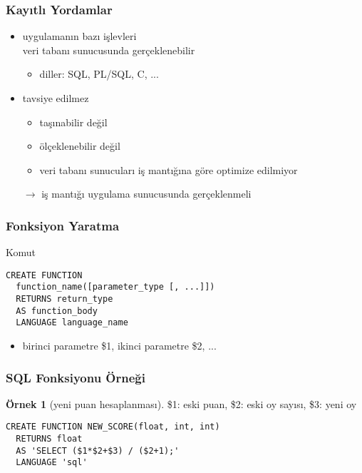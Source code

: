 \documentclass[dvipsnames]{beamer}
\theoremstyle{definition}
\theoremstyle{example}
\newtheorem{ornek}[theorem]{Örnek}
\theoremstyle{plain}
\begin{document}
\begin{frame}
  \frametitle{Kayıtlı Yordamlar}

  \begin{itemize}
    \item uygulamanın bazı işlevleri\\
      veri tabanı sunucusunda gerçeklenebilir
    \begin{itemize}
      \item diller: SQL, PL/SQL, C, ...
    \end{itemize}

    \pause
    \bigskip
    \item \alert{tavsiye edilmez}
    \begin{itemize}
      \item taşınabilir değil
      \item ölçeklenebilir değil
      \item veri tabanı sunucuları iş mantığına göre optimize edilmiyor
    \end{itemize}
    $\rightarrow$ iş mantığı uygulama sunucusunda gerçeklenmeli
  \end{itemize}
\end{frame}

\begin{frame}[fragile]
  \frametitle{Fonksiyon Yaratma}

  \begin{block}{Komut}
    \begin{lstlisting}
CREATE FUNCTION
  function_name([parameter_type [, ...]])
  RETURNS return_type
  AS function_body
  LANGUAGE language_name
    \end{lstlisting}
  \end{block}

  \begin{itemize}
    \item birinci parametre \$1, ikinci parametre \$2, ...
  \end{itemize}
\end{frame}

\begin{frame}[fragile]
  \frametitle{SQL Fonksiyonu Örneği}

  \begin{ornek}[yeni puan hesaplanması]
    \$1: eski puan, \$2: eski oy sayısı, \$3: yeni oy
    \begin{lstlisting}
CREATE FUNCTION NEW_SCORE(float, int, int)
  RETURNS float
  AS 'SELECT ($1*$2+$3) / ($2+1);'
  LANGUAGE 'sql'
    \end{lstlisting}
  \end{ornek}
\end{frame}
\end{document}
